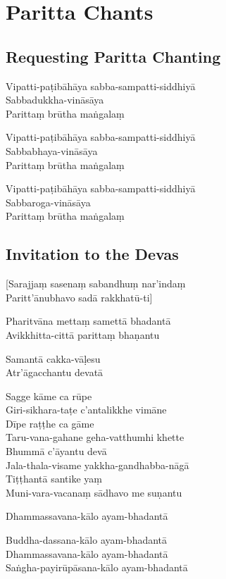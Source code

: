 \chapter{Paritta Chants}

\section{Requesting Paritta Chanting}

\begin{paritta}

Vipatti-paṭibāhāya sabba-sampatti-siddhiyā\\
Sabbadukkha-vināsāya\\
Parittaṃ brūtha maṅgalaṃ

Vipatti-paṭibāhāya sabba-sampatti-siddhiyā\\
Sabbabhaya-vināsāya\\
Parittaṃ brūtha maṅgalaṃ

Vipatti-paṭibāhāya sabba-sampatti-siddhiyā\\
Sabbaroga-vināsāya\\
Parittaṃ brūtha maṅgalaṃ

\end{paritta}


\clearpage

\section{Invitation to the Devas}

\begin{paritta}

[Sarajjaṃ sasenaṃ sabandhuṃ nar'indaṃ\\
Paritt'ānubhavo sadā rakkhatū-ti]

%
Pharitvāna mettaṃ samettā bhadantā\\
Avikkhitta-cittā parittaṃ bhaṇantu

%
Samantā cakka-vāḷesu\\
Atr'āgacchantu devatā

Sagge kāme ca rūpe\\
Giri-sikhara-taṭe c'antalikkhe vimāne\\
Dīpe raṭṭhe ca gāme\\
Taru-vana-gahane geha-vatthumhi khette\\
Bhummā c'āyantu devā\\
Jala-thala-visame yakkha-gandhabba-nāgā\\
Tiṭṭhantā santike yaṃ\\
Muni-vara-vacanaṃ sādhavo me suṇantu

Dhammassavana-kālo ayam-bhadantā


Buddha-dassana-kālo ayam-bhadantā\\
Dhammassavana-kālo ayam-bhadantā\\
Saṅgha-payirūpāsana-kālo ayam-bhadantā
\end{paritta}

